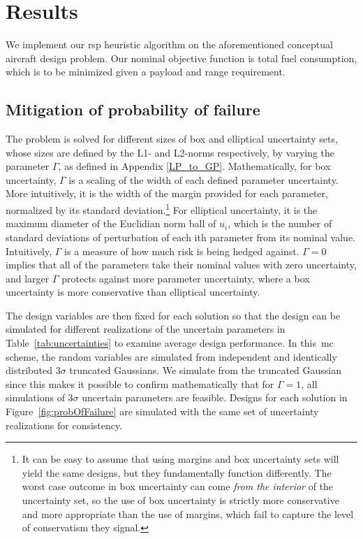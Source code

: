 \section{Results}

We implement our \gls{rsp} heuristic algorithm on the aforementioned conceptual aircraft design problem.
Our nominal objective function is total fuel consumption, which is
to be minimized given a payload and range requirement.

\subsection{Mitigation of probability of failure}

The problem is solved for different sizes of box and elliptical uncertainty sets,
whose sizes are defined by the L1- and L2-norms respectively,
by varying the parameter $\Gamma$, as defined in Appendix \ref{LP_to_GP}. Mathematically, for box uncertainty,
$\Gamma$ is a scaling of the width of each defined parameter uncertainty. More intuitively,
it is the width of the margin provided for each parameter, normalized by its standard deviation.\footnote{It
can be easy to assume that using margins and box uncertainty sets will yield the same designs,
but they fundamentally function
differently. The worst case outcome in box uncertainty can come \emph{from the interior} of the uncertainty
set, so the use of box uncertainty is strictly more conservative and more appropriate than the use of margins,
which fail to capture the level of conservatism they signal.}
For elliptical uncertainty, it is the maximum diameter of the Euclidian norm
ball of $u_i$, which is the number of standard deviations of perturbation of each ith parameter from its nominal value.
Intuitively, $\Gamma$ is a measure of how much risk is being hedged against. $\Gamma = 0$
implies that all of the parameters take their nominal values with zero uncertainty,
and larger $\Gamma$ protects against more parameter uncertainty, where a box uncertainty is
more conservative than elliptical uncertainty.

The design variables are then fixed for each solution so that the design can be simulated for
different realizations of the uncertain parameters in Table~\ref{tab:uncertainties}
to examine average design performance. In this~\gls{mc} scheme, the random variables
are simulated from independent and identically distributed $3\sigma$ truncated Gaussians.
We simulate from the truncated Gaussian since this makes it possible to
confirm mathematically that for $\Gamma = 1$, all simulations of $3\sigma$ uncertain parameters are feasible.
Designs for each solution in Figure~\ref{fig:probOfFailure} are simulated with the same set
of uncertainty realizations for consistency. \\

